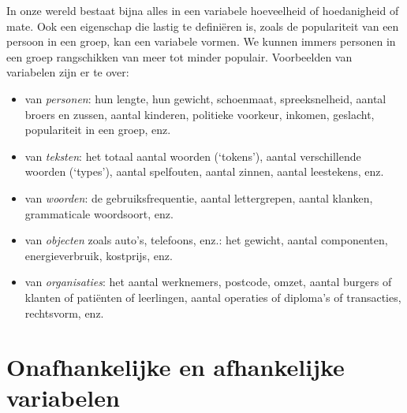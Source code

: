\documentclass[
]{book}
\begin{document}
In onze wereld bestaat bijna alles in een variabele hoeveelheid of
hoedanigheid of mate. Ook een eigenschap die lastig te definiëren is,
zoals de populariteit van een persoon in een groep, kan een variabele
vormen. We kunnen immers personen in een groep rangschikken van meer tot
minder populair. Voorbeelden van variabelen zijn er te over:

\begin{itemize}
\item
  van \emph{personen}: hun lengte, hun gewicht, schoenmaat, spreeksnelheid,
  aantal broers en zussen, aantal kinderen, politieke voorkeur,
  inkomen, geslacht, populariteit in een groep, enz.
\item
  van \emph{teksten}: het totaal aantal woorden (`tokens'), aantal
  verschillende woorden (`types'), aantal spelfouten, aantal zinnen,
  aantal leestekens, enz.
\item
  van \emph{woorden}: de gebruiksfrequentie, aantal lettergrepen, aantal
  klanken, grammaticale woordsoort, enz.
\item
  van \emph{objecten} zoals auto's, telefoons, enz.: het gewicht, aantal
  componenten, energieverbruik, kostprijs, enz.
\item
  van \emph{organisaties}: het aantal werknemers, postcode, omzet, aantal
  burgers of klanten of patiënten of leerlingen, aantal operaties of
  diploma's of transacties, rechtsvorm, enz.
\end{itemize}

\hypertarget{sec:onafhankelijkeafhankelijkevariabelen}{%
\section{Onafhankelijke en afhankelijke variabelen}\label{sec:onafhankelijkeafhankelijkevariabelen}}
\end{document}
